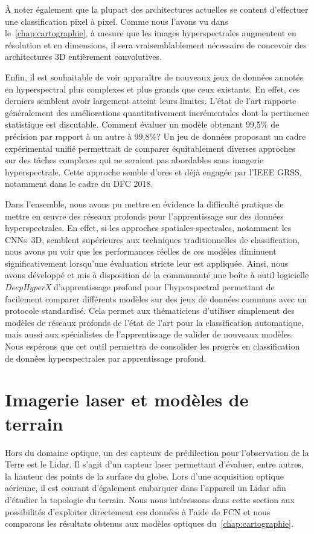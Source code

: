 À noter également que la plupart des architectures actuelles se content d'effectuer une classification pixel à pixel. Comme nous l'avons vu dans le~\cref{chap:cartographie}, à mesure que les images hyperspectrales augmentent en résolution et en dimensions, il sera vraisemblablement nécessaire de concevoir des architectures 3D entièrement convolutives.

Enfin, il est souhaitable de voir apparaître de nouveaux jeux de données annotés en hyperspectral plus complexes et plus grands que ceux existants. En effet, ces derniers semblent avoir largement atteint leurs limites. L'état de l'art rapporte généralement des améliorations quantitativement incrémentales dont la pertinence statistique est discutable. Comment évaluer un modèle obtenant 99,5\% de précision par rapport à un autre à 99,8\%? Un jeu de données proposant un cadre expérimental unifié permettrait de comparer équitablement diverses approches sur des tâches complexes qui ne seraient pas abordables sans imagerie hyperspectrale. Cette approche semble d'ores et déjà engagée par l'\gls{IEEE} \gls{GRSS}, notamment dans le cadre du \gls{DFC} 2018.

Dans l'ensemble, nous avons pu mettre en évidence la difficulté pratique de mettre en \oe{}uvre des réseaux profonds pour l'apprentissage sur des données hyperspectrales. En effet, si les approches spatiales-spectrales, notamment les \glspl{CNN}~3D, semblent supérieures aux techniques traditionnelles de classification, nous avons pu voir que les performances réelles de ces modèles diminuent significativement lorsqu'une évaluation stricte leur est appliquée. Ainsi, nous avons développé et mis à disposition de la communauté une boîte à outil logicielle \emph{DeepHyperX} d'apprentissage profond pour l'hyperspectral permettant de facilement comparer différents modèles sur des jeux de données communs avec un protocole standardisé. Cela permet aux thématiciens d'utiliser simplement des modèles de réseaux profonds de l'état de l'art pour la classification automatique, mais aussi aux spécialistes de l'apprentissage de valider de nouveaux modèles. Nous espérons que cet outil permettra de consolider les progrès en classification de données hyperspectrales par apprentissage profond.

\section{Imagerie laser et modèles de terrain}

Hors du domaine optique, un des capteurs de prédilection pour l'observation de la Terre est le \gls{Lidar}. Il s'agit d'un capteur laser permettant d'évaluer, entre autres, la hauteur des points de la surface du globe. Lors d'une acquisition optique aérienne, il est courant d'également embarquer dans l'appareil un \gls{Lidar} afin d'étudier la topologie du terrain. Nous nous intéressons dans cette section aux possibilités d'exploiter directement ces données à l'aide de \gls{FCN} et nous comparons les résultats obtenus aux modèles optiques du~\cref{chap:cartographie}.

